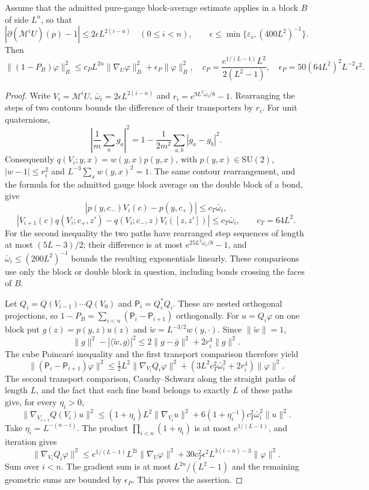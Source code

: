 \documentclass[11pt,letterpaper,reqno]{amsart}
\makeatletter
\theoremstyle{definition}
\newcommand{\ms@minorstart}{%
  \pushQED{\qed}\renewcommand{\qedsymbol}{$\blacksquare$}}
\newenvironment{lemma}[1][]{\ms@minorstart\ms@lemma[#1]}
  {\popQED\endms@lemma}
\theoremstyle{remark}
\makeatother
\begin{document}
\begin{lemma}[Regular averages]\label{C-397-23}
Assume that the admitted pure-gauge block-average estimate applies in
a block $B$ of side $L^n$, so that
\[
 |\partial(\mathcal M^iU)(p)-1|\le2\epsilon L^{2(i-n)}
 \quad(0\le i<n),\qquad
 \epsilon\le\min\{\varepsilon_\flat,(400L^2)^{-1}\}.
\]
Then
\[
 \|(1-P_B)\varphi\|_B^2\le c_PL^{2n}\|\nabla_U\varphi\|_B^2
                         +\epsilon_P\|\varphi\|_B^2,
 \quad c_P=\frac{e^{1/(L-1)}L^2}{2(L^2-1)},
 \quad\epsilon_P=50(64L^2)^2L^{-2}\epsilon^2.
\]
\end{lemma}

\begin{proof}
Write $V_i=\mathcal M^iU$,
$\bar\omega_i=2\epsilon L^{2(i-n)}$ and
$r_i=e^{9L^2\bar\omega_i/8}-1$.
Rearranging the steps of two contours bounds the difference of their
transporters by $r_i$.  For unit quaternions,
\[
 \left|\frac1m\sum_ag_a\right|^2
 =1-\frac1{2m^2}\sum_{a,b}|g_a-g_b|^2.
\]
Consequently $q(V_i;y,x)=w(y,x)p(y,x)$, with
$p(y,x)\in\mathrm{SU}(2)$, $|w-1|\le r_i^2$ and
$L^{-3}\sum_xw(y,x)^2=1$.
The same contour rearrangement, and the formula for the admitted
gauge block average on the double block of a bond, give
\[
 |p(y,c_-)V_i(c)-p(y,c_+)|\le c_T\bar\omega_i,
\]
\[
 |V_{i+1}(c)q(V_i;c_+,z')-
                 q(V_i;c_-,z)V_i([z,z'])|\le c_T\bar\omega_i,
 \qquad c_T=64L^2.
\]
For the second inequality the two paths have rearranged step
sequences of length at most $(5L-3)/2$; their difference is at most
$e^{25L^2\bar\omega_i/8}-1$, and
$\bar\omega_i\le(200L^2)^{-1}$ bounds the resulting exponentials
linearly.  These comparisons use only the block or double block in
question, including bonds crossing the faces of $B$.

Let $Q_i=Q(V_{i-1})\cdots Q(V_0)$ and
$\mathsf P_i=Q_i^*Q_i$.  These are nested orthogonal projections,
so $1-P_B=\sum_{i<n}(\mathsf P_i-\mathsf P_{i+1})$ orthogonally.
For $u=Q_i\varphi$ on one block put $g(z)=p(y,z)u(z)$ and
$\tilde w=L^{-3/2}w(y,\cdot)$.
Since $\|\tilde w\|=1$,
\[
 \|g\|^2-|\langle\tilde w,g\rangle|^2
 \le2\|g-\bar g\|^2+2r_i^4\|g\|^2.
\]
The cube Poincar\'e inequality and the first transport comparison
therefore yield
\[
 \|(\mathsf P_i-\mathsf P_{i+1})\varphi\|^2
 \le\tfrac12L^2\|\nabla_{V_i}Q_i\varphi\|^2+
        (3L^2c_T^2\bar\omega_i^2+2r_i^4)\|\varphi\|^2.
\]
The second transport comparison, Cauchy--Schwarz along the straight
paths of length $L$, and the fact that each fine bond belongs to
exactly $L$ of these paths give, for every $\eta_i>0$,
\[
 \|\nabla_{V_{i+1}}Q(V_i)u\|^2
 \le(1+\eta_i)L^2\|\nabla_{V_i}u\|^2+
          6(1+\eta_i^{-1})c_T^2\bar\omega_i^2\|u\|^2.
\]
Take $\eta_i=L^{-(n-i)}$. The product $\prod_{i<n}(1+\eta_i)$ is at most
$e^{1/(L-1)}$, and iteration gives
\[
 \|\nabla_{V_i}Q_i\varphi\|^2
 \le e^{1/(L-1)}L^{2i}\|\nabla_U\varphi\|^2+
       30c_T^2\epsilon^2L^{3(i-n)-3}\|\varphi\|^2.
\]
Sum over $i<n$.  The gradient sum is at most
$L^{2n}/(L^2-1)$ and the remaining geometric sums are bounded by
$\epsilon_P$.  This proves the assertion.
\end{proof}
\end{document}
